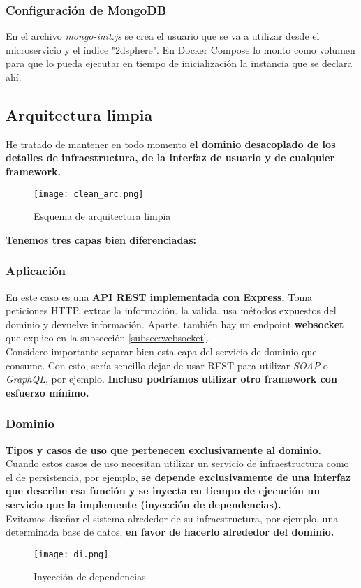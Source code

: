 \subsubsection{Configuración de MongoDB}

En el archivo \textit{mongo-init.js} se crea el usuario que se va a utilizar desde el microservicio y el índice "2dsphere". 
En Docker Compose lo monto como volumen para que lo pueda ejecutar en tiempo de inicialización la instancia que se declara ahí.

\subsection{Arquitectura limpia}\label{sec:clean}

He tratado de mantener en todo momento \textbf{el dominio desacoplado de los detalles de infraestructura, de la interfaz de usuario y de cualquier framework.}
\begin{figure}[H]
	\centering	
	\texttt{[image: clean\_arc.png]}
	\caption{Esquema de arquitectura limpia \cite{clean-arch}}
	\end{figure}

\textbf{Tenemos tres capas bien diferenciadas:}


\subsubsection{Aplicación}
En este caso es una \textbf{API REST implementada con Express.} Toma peticiones HTTP, extrae la información, la valida, usa métodos expuestos del dominio y devuelve información.
Aparte, también hay un endpoint \textbf{websocket} que explico en la subsección \ref{subsec:websocket}. \\
Considero importante separar bien esta capa del servicio de dominio que consume. Con esto, sería sencillo dejar de usar 
REST para utilizar \textit{SOAP} o \textit{GraphQL}, por ejemplo. \textbf{Incluso podríamos utilizar otro framework con esfuerzo mínimo.}

\subsubsection{Dominio}
\textbf{Tipos y casos de uso que pertenecen exclusivamente al dominio.}
Cuando estos casos de uso necesitan utilizar un servicio de infraestructura como el de persistencia, por ejemplo,
\textbf{se depende exclusivamente de una interfaz que describe esa función y se inyecta en tiempo de ejecución un servicio que la implemente (inyección de dependencias).}
\\Evitamos diseñar el sistema alrededor de su infraestructura, por ejemplo, una determinada base de datos, \textbf{en favor de hacerlo alrededor del dominio.}
\begin{figure}[H]
	\centering	
	\texttt{[image: di.png]}
	\caption{Inyección de dependencias}
	\end{figure}

